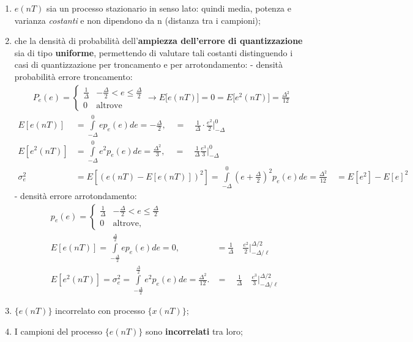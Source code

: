 \documentclass[
]{article}
\providecommand{\tightlist}{%
  \setlength{\itemsep}{0pt}\setlength{\parskip}{0pt}}
\begin{document}
\begin{enumerate}
  \begin{enumerate}
  \def\labelenumii{\arabic{enumii}.}
  \tightlist
  \item
    \(e(nT)\) sia un processo stazionario in senso lato: quindi media,
    potenza e varianza \emph{costanti} e non dipendono da n (distanza
    tra i campioni);
  \item
    che la densità di probabilità dell'\textbf{ampiezza dell'errore di
    quantizzazione} sia di tipo \textbf{uniforme}, permettendo di
    valutare tali costanti distinguendo i casi di quantizzazione per
    troncamento e per arrotondamento: - densità probabilità errore
    troncamento: \begin{align*}
        P_e(e)= \left\{
        \begin{array}{ll}
        \frac{1}{\Delta}& -\frac{\Delta}{2}<e\leq\frac{\Delta}{2}\\
        0 & \text{altrove}
        \end{array}\right. \to E\Big[e(nT)\Big]= 0 = E\Big[e^{2}(nT)\Big] = \frac{\Delta^{2}}{12}
        \end{align*}
    \begin{align*}E[e(nT)]&=\int\limits_{-\Delta}^{0}e p_{e}(e) de=-\frac{\Delta}{2},\quad=\quad\frac{1}{\Delta}\cdot\frac{e^{2}}{2}\Bigg|_{-\Delta}^{0}\\E[e^{2}(nT)]&=\int\limits_{-\Delta}^{0}e^{2} p_{e}(e) de=\frac{\Delta^{2}}{3},\quad=\quad\frac{1}{\Delta} \frac{e^{3}}{3}\Bigg|_{-\Delta}^{0}\\\sigma_{e}^{2}&=E[(e(nT)-E[e(nT)])^{2}]=\int\limits_{-\Delta}^{0}\left(e+\frac{\Delta}{2}\right)^{2} p_{e}(e) de=\frac{\Delta^{2}}{12}\quad= E[e^{2}]-E[e]^{2}\end{align*}
    - densità errore arrotondamento:
    \begin{align*}&p_e(e)=\begin{cases}\frac{1}{\Delta}&-\frac{\Delta}{2}<e\leq\frac{\Delta}{2}\\0&\text{altrove,}\end{cases}\\&E[e(nT)]=\int\limits_{-\frac{\Delta}{2}}^{\frac{\Delta}{2}}e p_e(e) de=0,&=\frac{1}{\Delta}\quad\frac{e^{2}}{2}\Bigg|_{-\Delta/\ell}^{\Delta/2}\\&E[e^2(nT)]=\sigma_e^2=\int\limits_{-\frac{\Delta}{2}}^{\frac{\Delta}{2}}e^2 p_e(e) de=\frac{\Delta^2}{12}.&=\quad\frac{1}{\Delta}\quad\frac{e^3}{3}\Bigg|_{-\Delta/\ell}^{\Delta/2}\end{align*}
  \item
    \(\{e(nT)\}\) incorrelato con processo \(\{x(nT)\}\);
  \item
    I campioni del processo \(\{e(nT)\}\) sono \textbf{incorrelati} tra
    loro;
  \end{enumerate}


\end{enumerate}
\end{document}
